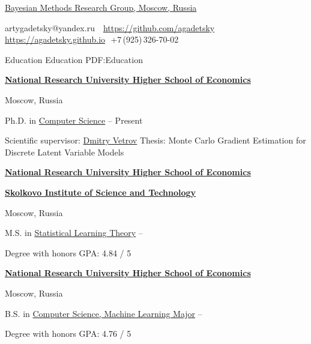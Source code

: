 \documentclass[letterpaper,MMMyyyy,nonstopmode]{simpleresumecv}
\newcommand{\CVAuthor}{Artyom Gadetsky}
\begin{document}

\Title{\CVAuthor}

\begin{SubTitle}
\href{http://bayesgroup.ru}{Bayesian Methods Research Group, Moscow, Russia}
\par
artygadetsky@yandex.ru
\,\SubBulletSymbol\,
\href{https://github.com/agadetsky}{https://github.com/agadetsky}
\,\SubBulletSymbol\,\href{https://agadetsky.github.io}{https://agadetsky.github.io}\,\SubBulletSymbol\,
+7\,(925)\,326-70-02
\end{SubTitle}

\begin{Body}


\Section
{Education}
{Education}
{PDF:Education}

\Entry
\href{https://www.hse.ru/en/}
{\textbf{National Research University Higher School of Economics}}
\par
Moscow, Russia

\Gap
\BulletItem
Ph.D. in
\href{https://aspirantura.hse.ru/en/cs/}
{Computer Science}
\hfill
{} --
Present
\begin{Detail}
\SubBulletItem
Scientific supervisor: \href{https://www.hse.ru/en/staff/dvetrov}{Dmitry Vetrov}
\SubBulletItem
Thesis: Monte Carlo Gradient Estimation for Discrete Latent Variable Models
\end{Detail}
\Gap

\Entry
\href{https://www.hse.ru/en/}
{\textbf{National Research University Higher School of Economics}}
\par
\href{https://www.skoltech.ru/en/}{\textbf{Skolkovo Institute of Science and Technology}}
\par
Moscow, Russia

\Gap
\BulletItem
M.S. in
\href{https://www.hse.ru/en/ma/sltheory/}
{Statistical Learning Theory}
\hfill
{} --
\begin{Detail}
\SubBulletItem
Degree with honors
\SubBulletItem
GPA: 4.84 / 5
\end{Detail}
\Gap

\Entry
\href{https://www.hse.ru/en/}
{\textbf{National Research University Higher School of Economics}}
\par
Moscow, Russia

\Gap
\BulletItem
B.S. in
\href{https://www.hse.ru/en/ba/ami/}
{Computer Science, Machine Learning Major}
\hfill
{} --
\begin{Detail}
\SubBulletItem
Degree with honors
\SubBulletItem
GPA: 4.76 / 5
\end{Detail}


\end{Body}
\end{document}
